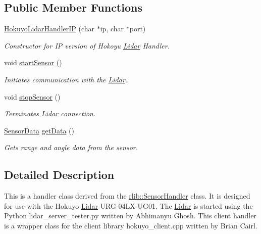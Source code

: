 \subsection*{Public Member Functions}
\begin{DoxyCompactItemize}
\item 
\hyperlink{classrlib_1_1HokuyoLidarHandlerIP_a6f771103bc0c0d5d989b8cd97ceaab54}{Hokuyo\-Lidar\-Handler\-I\-P} (char $\ast$ip, char $\ast$port)
\begin{DoxyCompactList}\small\item\em Constructor for I\-P version of Hokoyu \hyperlink{classrlib_1_1Lidar}{Lidar} Handler. \end{DoxyCompactList}\item 
\hypertarget{classrlib_1_1HokuyoLidarHandlerIP_a379dbeec9ace02bb0d4840509f009576}{void \hyperlink{classrlib_1_1HokuyoLidarHandlerIP_a379dbeec9ace02bb0d4840509f009576}{start\-Sensor} ()}\label{classrlib_1_1HokuyoLidarHandlerIP_a379dbeec9ace02bb0d4840509f009576}

\begin{DoxyCompactList}\small\item\em Initiates communication with the \hyperlink{classrlib_1_1Lidar}{Lidar}. \end{DoxyCompactList}\item 
\hypertarget{classrlib_1_1HokuyoLidarHandlerIP_aafe7200d26d5a38642da2d58e6ccf2b3}{void \hyperlink{classrlib_1_1HokuyoLidarHandlerIP_aafe7200d26d5a38642da2d58e6ccf2b3}{stop\-Sensor} ()}\label{classrlib_1_1HokuyoLidarHandlerIP_aafe7200d26d5a38642da2d58e6ccf2b3}

\begin{DoxyCompactList}\small\item\em Terminates \hyperlink{classrlib_1_1Lidar}{Lidar} connection. \end{DoxyCompactList}\item 
\hyperlink{classrlib_1_1SensorData}{Sensor\-Data} \hyperlink{classrlib_1_1HokuyoLidarHandlerIP_a7882c2d6edebb830a9986d202ad05b41}{get\-Data} ()
\begin{DoxyCompactList}\small\item\em Gets range and angle data from the sensor. \end{DoxyCompactList}\end{DoxyCompactItemize}


\subsection{Detailed Description}
This is a handler class derived from the \hyperlink{classrlib_1_1SensorHandler}{rlib\-::\-Sensor\-Handler} class. It is designed for use with the Hokuyo \hyperlink{classrlib_1_1Lidar}{Lidar} U\-R\-G-\/04\-L\-X-\/\-U\-G01. The \hyperlink{classrlib_1_1Lidar}{Lidar} is started using the Python lidar\-\_\-server\-\_\-tester.\-py written by Abhimanyu Ghosh. This client handler is a wrapper class for the client library hokuyo\-\_\-client.\-cpp written by Brian Cairl. 

